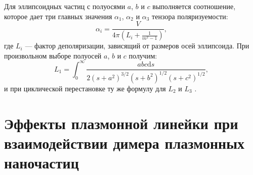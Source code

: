Для эллипсоидных частиц с полуосями $ a $, $ b $ и $ c $ выполняется соотношение, которое дает три главных значения $ \alpha_1 $, $ \alpha_2 $ и $ \alpha_3 $ тензора поляризуемости:
\begin{equation}
\alpha _i = \frac{V}{4 \pi (L_i + \frac{1}{m^2 - 1})},
\label{eq:polarizabilityEllip}
\end{equation}
где $ L_i $ --- фактор деполяризации, зависящий от размеров осей эллипсоида. При произвольном выборе полуосей $ a $, $ b $ и $ c $ получим:
\begin{equation}
L_1 = \int_0^\infty \frac{a b c \mathrm{d} s}{2 (s + a^2)^{3/2} (s + b^2)^{1/2} (s + c^2)^{1/2}},
\label{eq:Lfactor}
\end{equation}
и при циклической перестановке ту же формулу для $ L_2 $ и $ L_3 $ \cite{LPP_Hulst}.

\section{Эффекты плазмонной линейки при взаимодействии димера плазмонных наночастиц}

